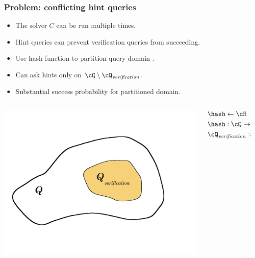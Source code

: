 \documentclass[first,firstsupp,last]{ETHclass}
\begin{document}
\begin{frame}[t]
  \frametitle{Problem: conflicting hint queries}
  \begin{itemize}
    \item<1-5> The solver $C$ can be run multiple times.
    \item<2-5> Hint queries can prevent verification queries from succeeding.
    \item<3-5> Use hash function to partition query domain \cite{dodis2009security}.
    \item<4-5> Can ask hints only on $\cQ \setminus \cQ_{\mathit{verification}}$.
    \item<5> Substantial success probability for partitioned domain.
  \end{itemize}
  \begin{columns}
    \begin{column}{.4\textwidth}
      \includegraphics[scale=0.08]{images/hashSets.pdf}
    \end{column}
    \begin{column}{.4\textwidth}
      \begin{align*}
        &\hash \leftarrow \cH \\
        &\hash : \cQ \rightarrow \{0,1,\dots, 2(h+v) - 1\} \\
        &\cQ_{\mathit{verification}} := {q \in \cQ : hash(q) = 0}
      \end{align*}
    \end{column}
  \end{columns}
\end{frame}
\end{document}
